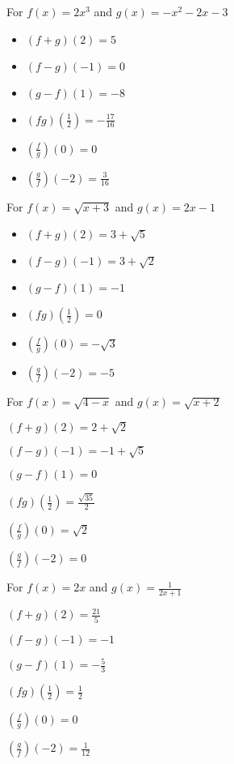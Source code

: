 \begin{exenum}
\item For $f(x) = 2x^3$ and  $g(x) = -x^2-2x-3$

\begin{itemize}
\item  $(f+g)(2) = 5$
\item  $(f-g)(-1) = 0$
\item  $(g-f)(1) = -8$
\item  $(fg)\left(\frac{1}{2}\right) = -\frac{17}{16}$
\item  $\left(\frac{f}{g}\right)(0) = 0$
\item  $\left(\frac{g}{f}\right)\left(-2\right) = \frac{3}{16}$
\end{itemize}

\item For $f(x) = \sqrt{x+3}$ and  $g(x) = 2x-1$

\begin{itemize}
\item  $(f+g)(2) = 3+\sqrt{5}$
\item  $(f-g)(-1) = 3+\sqrt{2}$
\item  $(g-f)(1) = -1$
\item  $(fg)\left(\frac{1}{2}\right) = 0$
\item  $\left(\frac{f}{g}\right)(0) = -\sqrt{3}$
\item  $\left(\frac{g}{f}\right)\left(-2\right) = -5$
\end{itemize}

\item For $f(x) = \sqrt{4-x}$ and $g(x) = \sqrt{x+2}$

\begin{shortitemize}[MMMMM]
\item  $(f+g)(2) = 2+\sqrt{2}$
\item  $(f-g)(-1) = -1+\sqrt{5}$
\item  $(g-f)(1) = 0$
\item  $(fg)\left(\frac{1}{2}\right) = \frac{\sqrt{35}}{2}$
\item  $\left(\frac{f}{g}\right)(0) = \sqrt{2}$
\item  $\left(\frac{g}{f}\right)\left(-2\right) = 0$
\end{shortitemize}

\item For  $f(x) = 2x$ and  $g(x) = \frac{1}{2x+1}$

\begin{shortitemize}[MMMMMMMMMMM]
\item  $(f+g)(2) = \frac{21}{5}$
\item  $(f-g)(-1) = -1$
\item  $(g-f)(1) = -\frac{5}{3}$
\item  $(fg)\left(\frac{1}{2}\right) = \frac{1}{2}$
\item  $\left(\frac{f}{g}\right)(0) = 0$
\item  $\left(\frac{g}{f}\right)\left(-2\right) = \frac{1}{12}$
\end{shortitemize}


\end{exenum}
